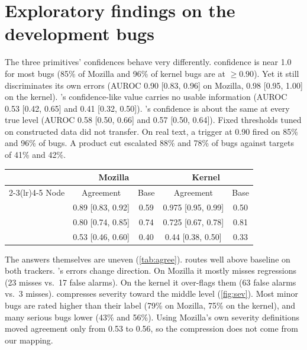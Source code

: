 \section{Exploratory findings on the development bugs}
\label{sec:explore}

The three primitives' confidences behave very differently. \choice{}
confidence is near 1.0 for most bugs (85\% of Mozilla and 96\% of kernel
bugs are at $\geq 0.90$). Yet it still discriminates its own errors
(AUROC 0.90 [0.83, 0.96] on Mozilla, 0.98 [0.95, 1.00] on the kernel). \noul{}'s confidence-like
value carries no usable information (AUROC 0.53 [0.42, 0.65] and 0.41 [0.32, 0.50]). \score{}'s confidence is about the same at every true level (AUROC 0.58
[0.50, 0.66] and 0.57 [0.50, 0.64]).
Fixed thresholds tuned on constructed data did not transfer. On real
text, a \choice{} trigger at 0.90 fired on 85\% and 96\% of bugs. A
product cut escalated 88\% and 78\% of bugs against targets of 41\% and
42\%.
\begin{coltable}
\centering
\caption{Node agreement with reference labels on the development bugs
(Wilson 95\% intervals). Baseline: the most frequent label.}
\label{tab:agree}
\footnotesize
\setlength{\tabcolsep}{3.5pt}
\begin{tabular}{lcccc}
\toprule
 & \multicolumn{2}{c}{Mozilla} & \multicolumn{2}{c}{Kernel} \\
\cmidrule(lr){2-3}\cmidrule(lr){4-5}
Node & Agreement & Base & Agreement & Base \\
\midrule
\choice{} & 0.89 [0.83, 0.92] & 0.59 & 0.975 [0.95, 0.99] & 0.50 \\
\noul{}   & 0.80 [0.74, 0.85] & 0.74 & 0.725 [0.67, 0.78] & 0.81 \\
\score{}  & 0.53 [0.46, 0.60] & 0.40 & 0.44 [0.38, 0.50] & 0.33 \\
\bottomrule
\end{tabular}
\end{coltable}

The answers themselves are uneven (\cref{tab:agree}). \choice{} routes
well above baseline on both trackers. \noul{}'s errors change direction. On Mozilla it mostly misses
regressions (23 misses vs.\ 17 false alarms). On the kernel it
over-flags them (63 false alarms vs.\ 3 misses). \score{} compresses severity toward the middle level
(\cref{fig:sev}). Most minor bugs are rated higher than their label
(79\% on Mozilla, 75\% on the kernel), and many serious bugs lower (43\%
and 56\%). Using Mozilla's own severity definitions moved agreement only
from 0.53 to 0.56, so the compression does not come from our mapping.

